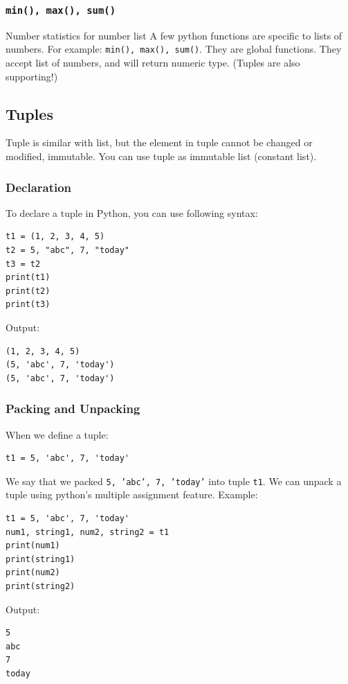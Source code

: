 \documentclass[12pt]{book}
\begin{document}
\subsubsection{\texttt{min(), max(), sum()}}
\label{sec:orgbfe2bf6}
Number statistics for number list
A few python functions are specific to lists of numbers. For example: \texttt{min(), max(), sum()}. They are global functions. They accept list of numbers, and will return numeric type. (Tuples are also supporting!)

\subsection{Tuples}
\label{sec:org5d8ee3d}
Tuple is similar with list, but the element in tuple cannot be changed or modified, immutable. You can use tuple as immutable list (constant list).
\subsubsection{Declaration}
\label{sec:orgaf2abd5}
To declare a tuple in Python, you can use following syntax:
\begin{verbatim}
t1 = (1, 2, 3, 4, 5)
t2 = 5, "abc", 7, "today"
t3 = t2
print(t1)
print(t2)
print(t3)
\end{verbatim}
Output:
\begin{verbatim}
(1, 2, 3, 4, 5)
(5, 'abc', 7, 'today')
(5, 'abc', 7, 'today')
\end{verbatim}
\subsubsection{Packing and Unpacking}
\label{sec:orgc59f4c8}
When we define a tuple:
\begin{verbatim}
t1 = 5, 'abc', 7, 'today'
\end{verbatim}
We say that we packed \texttt{5, 'abc', 7, 'today'} into tuple \texttt{t1}. We can unpack a tuple using python's multiple assignment feature. Example:
\begin{verbatim}
t1 = 5, 'abc', 7, 'today'
num1, string1, num2, string2 = t1
print(num1)
print(string1)
print(num2)
print(string2)
\end{verbatim}
Output:
\begin{verbatim}
5
abc
7
today
\end{verbatim}
\end{document}

